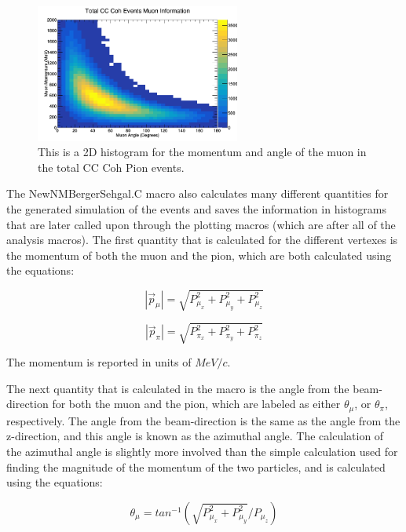 \documentclass[11pt]{article}
\begin{document}
\begin{figure}[H]
\centering
\includegraphics[width=0.6\textwidth]{NewNMBergerSehgalImages/9-TotalCCCohMuonInfoNMBS.png}
\caption{This is a 2D histogram for the momentum and angle of the muon in the total CC Coh Pion events.}
\end{figure}

The NewNMBergerSehgal.C macro also calculates many different quantities for the generated simulation of the events and saves the information in histograms that are later called upon through the plotting macros (which are after all of the analysis macros). The first quantity that is calculated for the different vertexes is the momentum of both the muon and the pion, which are both calculated using the equations:

\begin{equation}
|\vec{p}_\mu| = \sqrt{P_{\mu_x}^2 + P_{\mu_y}^2 + P_{\mu_z}^2}
\end{equation}

\begin{equation}
|\vec{p}_\pi| = \sqrt{P_{\pi_x}^2 + P_{\pi_y}^2 + P_{\pi_z}^2}
\end{equation}

\noindent
The momentum is reported in units of $MeV/c$.

The next quantity that is calculated in the macro is the angle from the beam-direction for both the muon and the pion, which are labeled as either $\theta_\mu$, or $\theta_\pi$, respectively. The angle from the beam-direction is the same as the angle from the z-direction, and this angle is known as the azimuthal angle. The calculation of the azimuthal angle is slightly more involved than the simple calculation used for finding the magnitude of the momentum of the two particles, and is calculated using the equations:

\begin{equation}
\theta_\mu = tan^{-1}(\sqrt{P_{\mu_x}^2 + P_{\mu_y}^2}/{P_{\mu_z}})
\end{equation}
\end{document}
